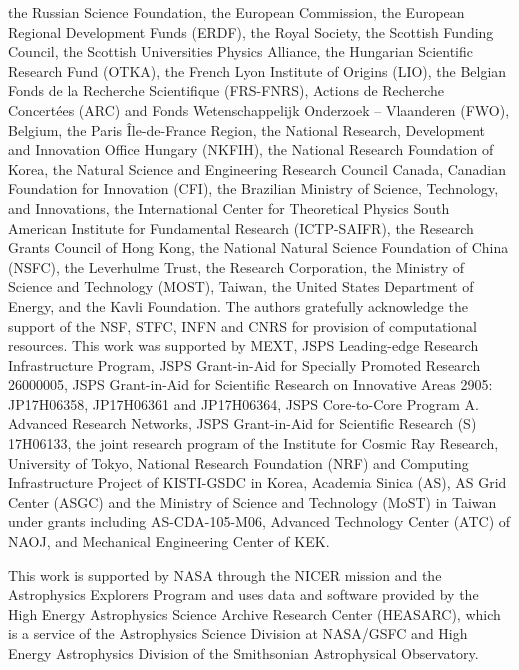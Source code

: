 the Russian Science Foundation,
the European Commission,
the European Regional Development Funds (ERDF),
the Royal Society, 
the Scottish Funding Council, 
the Scottish Universities Physics Alliance, 
the Hungarian Scientific Research Fund (OTKA),
the French Lyon Institute of Origins (LIO),
the Belgian Fonds de la Recherche Scientifique (FRS-FNRS), 
Actions de Recherche Concertées (ARC) and
Fonds Wetenschappelijk Onderzoek – Vlaanderen (FWO), Belgium,
the Paris \^{I}le-de-France Region, 
the National Research, Development and Innovation Office Hungary (NKFIH), 
the National Research Foundation of Korea,
the Natural Science and Engineering Research Council Canada,
Canadian Foundation for Innovation (CFI),
the Brazilian Ministry of Science, Technology, and Innovations,
the International Center for Theoretical Physics South American Institute for Fundamental Research (ICTP-SAIFR), 
the Research Grants Council of Hong Kong,
the National Natural Science Foundation of China (NSFC),
the Leverhulme Trust, 
the Research Corporation, 
the Ministry of Science and Technology (MOST), Taiwan,
the United States Department of Energy,
and
the Kavli Foundation.
The authors gratefully acknowledge the support of the NSF, STFC, INFN and CNRS for provision of computational resources.
This work was supported by MEXT, JSPS Leading-edge Research Infrastructure Program, JSPS Grant-in-Aid for Specially Promoted Research 26000005, JSPS Grant-in-Aid for Scientific Research on Innovative Areas 2905: JP17H06358, JP17H06361 and JP17H06364, JSPS Core-to-Core Program A. Advanced Research Networks, JSPS Grant-in-Aid for Scientific Research (S) 17H06133, the joint research program of the Institute for Cosmic Ray Research, University of Tokyo, National Research Foundation (NRF) and Computing Infrastructure Project of KISTI-GSDC in Korea, Academia Sinica (AS), AS Grid Center (ASGC) and the Ministry of Science and Technology (MoST) in Taiwan under grants including AS-CDA-105-M06, Advanced Technology Center (ATC) of NAOJ, and Mechanical Engineering Center of KEK. 

This work is supported by NASA through the NICER mission and the Astrophysics Explorers Program and uses data and software provided by the High Energy Astrophysics Science Archive Research Center (HEASARC), which is a service of the Astrophysics Science Division at NASA/GSFC and High Energy Astrophysics Division of the Smithsonian Astrophysical Observatory.

